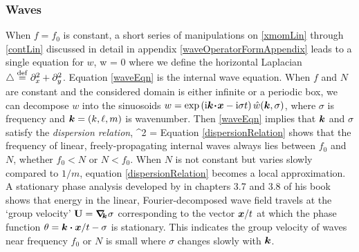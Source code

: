 \documentclass[12pt, oneside]{book}
\begin{document}
\subsubsection{Waves} 

When $f=f_0$ is constant, a short series of manipulations on \eqref{xmomLin} through \eqref{contLin} discussed in detail in appendix \ref{waveOperatorFormAppendix} leads to a single equation for $w$,
\beq
{} w = 0 \com
\label{waveEqn}
\eeq
where we define the horizontal Laplacian $\triangle \stackrel{\mathrm{def}}{=} \partial_x^2 + \partial_y^2$.  Equation \eqref{waveEqn} is the internal wave equation.  When $f$ and $N$ are constant and the considered domain is either infinite or a periodic box, we can decompose $w$ into the sinuosoids $w = \exp \left ( \mathrm{i} \boldsymbol{k} \! \boldsymbol \cdot \! \boldsymbol x - \mathrm{i} \sigma t \right ) \hat w(\boldsymbol{k},\sigma)$, where $\sigma$ is frequency and $\boldsymbol{k} = \left ( k , \ell, m \right )$ is wavenumber.  Then \eqref{waveEqn} implies that $\boldsymbol{k}$ and $\sigma$  satisfy the \textit{dispersion relation},
\beq
\sigma^2 =  \per
\label{dispersionRelation}
\eeq
Equation \eqref{dispersionRelation} shows that the frequency of linear, freely-propagating internal waves always lies between $f_0$ and $N$, whether $f_0 < N$ or $N < f_0$.  When $N$ is not constant but varies slowly compared to $1/m$, equation \eqref{dispersionRelation} becomes a local approximation.  A stationary phase analysis developed by \citet{lighthill2001waves} in chapters 3.7 and 3.8 of his book shows that energy in the linear, Fourier-decomposed wave field travels at the `group velocity' $\mathbf{U} = \boldsymbol \nabla_{\! \! \boldsymbol{k}} \hspace{0.1ex} \sigma$ corresponding to the vector $\boldsymbol x/t$ at which the phase function $\theta = \boldsymbol{k} \boldsymbol \cdot \boldsymbol x / t - \sigma$ is stationary.  This indicates the group velocity of waves near frequency $f_0$ or $N$ is small where $\sigma$ changes slowly with $\boldsymbol{k}$.
\end{document}
